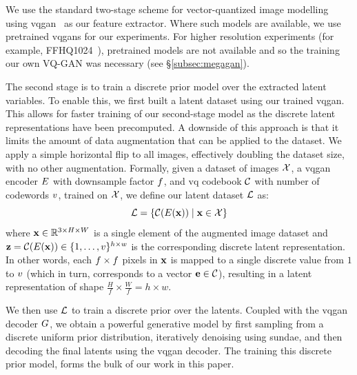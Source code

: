 We use the standard two-stage scheme for vector-quantized image
modelling~\cite{oord2018neural,razavi2019generating,esser2021taming,bondtaylor2021unleashing}
using \gls{vqgan}~\cite{esser2021taming} as our feature extractor. Where such
models are available, we use pretrained \glspl{vqgan} for our experiments. For
higher resolution experiments (for example,
FFHQ1024~\cite{karras2019stylebased}), pretrained models are not available and
so the training our own VQ-GAN was necessary (see \S\ref{subsec:megagan}). 

The second stage is to train a discrete prior model over the extracted latent variables.
To enable this, we first built a latent dataset using our trained \gls{vqgan}.
This allows for faster training of our second-stage model as the discrete latent
representations have been precomputed. A downside of this approach is that it
limits the amount of data augmentation that can be applied to the dataset. We
apply a simple horizontal flip to all images, effectively doubling the dataset
size, with no other augmentation. Formally, given a dataset of images
$\mathcal{X}$, a \gls{vqgan} encoder $E$ with downsample factor
$f$, and \gls{vq} codebook $\mathcal{C}$ with
number of codewords $v$, trained on $\mathcal{X}$, we define our
latent dataset $\mathcal{L}$ as:
\begin{equation}
    \mathcal{L} = \{\mathcal{C}(E(\mathbf{x})) \mid \mathbf{x} \in \mathcal{X} \}
\end{equation}
where $\mathbf{x} \in \mathbb{R}^{3 \times H \times W}$ is a single element of the
augmented image
dataset and $\mathbf{z} = \mathcal{C}(E(\mathbf{x})) \in \{1, \dots,
v\}^{h \times w}$ is the corresponding discrete latent
representation. In other words, each $f \times f$
pixels in $\mathbf{x}$ is mapped to a single discrete value from $1$ to
$v$ (which in turn, corresponds to a vector $\mathbf{e} \in
\mathcal{C}$),
resulting in a latent representation of shape $\frac{H}{f} \times \frac{W}{f} =
h \times w$.

We then use $\mathcal{L}$ to train a discrete prior over the latents. Coupled
with the \gls{vqgan} decoder $G$, we obtain a powerful generative
model by first sampling from a discrete uniform prior distribution, iteratively
denoising using \gls{sundae}, and then decoding the final latents using the
\gls{vqgan} decoder. The training this discrete prior model, forms the bulk of our
work in this paper.

